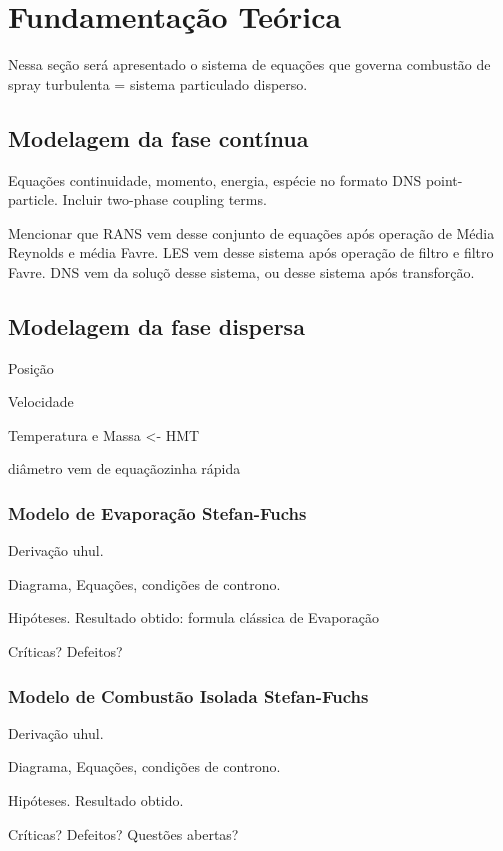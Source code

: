 \section{Fundamentação Teórica}

Nessa seção será apresentado o sistema de equações que governa combustão de spray turbulenta = sistema particulado disperso.

\subsection{Modelagem da fase contínua}

Equações continuidade, momento, energia, espécie no formato DNS point-particle. 
Incluir two-phase coupling terms.

Mencionar que RANS vem desse conjunto de equações após operação de Média Reynolds e média Favre.
LES vem desse sistema após operação de filtro e filtro Favre. 
DNS vem da soluçõ desse sistema, ou desse sistema após transforção.

\subsection{Modelagem da fase dispersa}

Posição

Velocidade

Temperatura e Massa <- HMT

diâmetro vem de equaçãozinha rápida

\subsubsection{Modelo de Evaporação Stefan-Fuchs}

Derivação uhul.

Diagrama, Equações, condições de controno.

Hipóteses. Resultado obtido: formula clássica de Evaporação

Críticas? Defeitos?

\subsubsection{Modelo de Combustão Isolada Stefan-Fuchs}

Derivação uhul.

Diagrama, Equações, condições de controno.

Hipóteses. Resultado obtido.

Críticas? Defeitos? Questões abertas?
